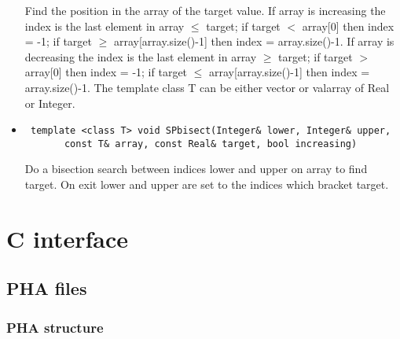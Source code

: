 \documentclass[11pt]{book}
\begin{document}
\begin{itemize}
          Find the position in the array of the target value. If array 
          is increasing the index is the last element in array $\leq$
          target; if target $<$ array[0] then index = -1; if target
          $\geq$ array[array.size()-1] then index = array.size()-1.
          If array is decreasing the index is the last element in
          array $\geq$ target; if target $>$ array[0] then index = -1; 
          if target $\leq$ array[array.size()-1] then index = 
          array.size()-1. The template class T can be either vector 
          or valarray of Real or Integer.

\item  \begin{verbatim} template <class T> void SPbisect(Integer& lower, Integer& upper, 
       const T& array, const Real& target, bool increasing)\end{verbatim}

          Do a bisection search between indices lower and upper on
          array to find target. On exit lower and upper are set to
          the indices which bracket target.

\end{itemize}



\chapter{C interface}

\section{PHA files}

\subsection{PHA structure}
\end{document}
